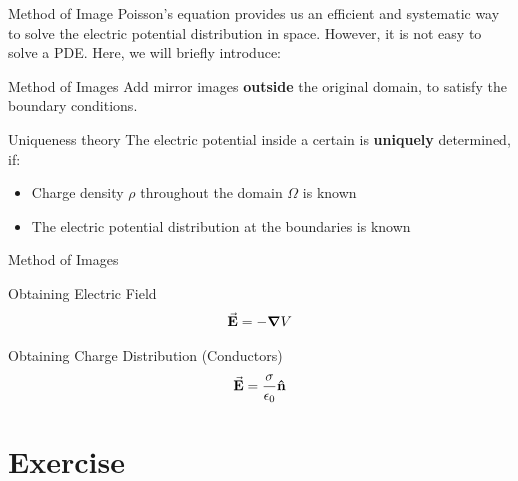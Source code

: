 \documentclass{beamer}
\begin{document}
\begin{frame}{Method of Image}
    Poisson's equation provides us an efficient and systematic way to solve the electric potential distribution in space.
    However, it is not easy to solve a PDE. Here, we will briefly introduce:
    \vspace{.5em}
    
    \begin{beamerboxesrounded}[shadow=true]{Method of Images}
        Add mirror images \textbf{outside} the original domain, to satisfy the boundary conditions.
    \end{beamerboxesrounded}
    \begin{block}{Uniqueness theory}
        The electric potential inside a certain is \textbf{uniquely} determined, if:
        \begin{itemize}
            \item Charge density $\rho$ throughout the domain $\Omega$ is known
            \item The electric potential distribution at the boundaries is known
        \end{itemize}
    \end{block}
\end{frame}

\begin{frame}{Method of Images}
    \begin{block}{Obtaining Electric Field}
        \begin{equation*}
            \va{E} = -\grad{V}
        \end{equation*}
    \end{block}
    \begin{block}{Obtaining Charge Distribution (Conductors)}
        \begin{equation*}
            \va{E} = \frac{\sigma}{\epsilon_0} \vu{n}
        \end{equation*}
    \end{block}
\end{frame}











\section{Exercise}
\end{document}
